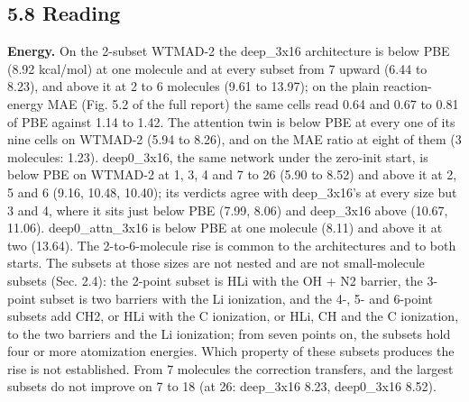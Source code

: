 \documentclass[10pt,a4paper]{article}
\begin{document}
\subsection*{5.8 Reading}

\textbf{Energy.} On the 2-subset WTMAD-2 the deep\_3x16 architecture is below PBE (8.92 kcal/mol) at one molecule and at every subset from 7 upward (6.44 to 8.23), and above it at 2 to 6 molecules (9.61 to 13.97); on the plain reaction-energy MAE (Fig. 5.2 of the full report) the same cells read 0.64 and 0.67 to 0.81 of PBE against 1.14 to 1.42. The attention twin is below PBE at every one of its nine cells on WTMAD-2 (5.94 to 8.26), and on the MAE ratio at eight of them (3 molecules: 1.23). deep0\_3x16, the same network under the zero-init start, is below PBE on WTMAD-2 at 1, 3, 4 and 7 to 26 (5.90 to 8.52) and above it at 2, 5 and 6 (9.16, 10.48, 10.40); its verdicts agree with deep\_3x16's at every size but 3 and 4, where it sits just below PBE (7.99, 8.06) and deep\_3x16 above (10.67, 11.06). deep0\_attn\_3x16 is below PBE at one molecule (8.11) and above it at two (13.64). The 2-to-6-molecule rise is common to the architectures and to both starts. The subsets at those sizes are not nested and are not small-molecule subsets (Sec. 2.4): the 2-point subset is HLi with the OH + N2 barrier, the 3-point subset is two barriers with the Li ionization, and the 4-, 5- and 6-point subsets add CH2, or HLi with the C ionization, or HLi, CH and the C ionization, to the two barriers and the Li ionization; from seven points on, the subsets hold four or more atomization energies. Which property of these subsets produces the rise is not established. From 7 molecules the correction transfers, and the largest subsets do not improve on 7 to 18 (at 26: deep\_3x16 8.23, deep0\_3x16 8.52).
\end{document}
